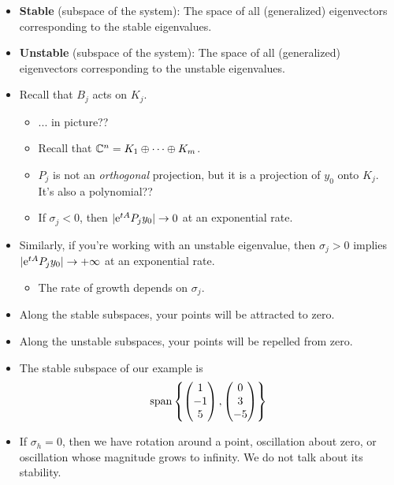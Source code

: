 \documentclass[../notes.tex]{subfiles}
\begin{document}
\begin{itemize}
    \item \textbf{Stable} (subspace of the system): The space of all (generalized) eigenvectors corresponding to the stable eigenvalues.
    \item \textbf{Unstable} (subspace of the system): The space of all (generalized) eigenvectors corresponding to the unstable eigenvalues.
    \item Recall that $B_j$ acts on $K_j$.
    \begin{itemize}
        \item ... in picture??
        \item Recall that $\C^n=K_1\oplus\cdots\oplus K_m$.
        \item $P_j$ is not an \emph{orthogonal} projection, but it is a projection of $y_0$ onto $K_j$. It's also a polynomial??
        \item If $\sigma_j<0$, then $|\e[tA]P_jy_0|\to 0$ at an exponential rate.
    \end{itemize}
    \item Similarly, if you're working with an unstable eigenvalue, then $\sigma_j>0$ implies $|\e[tA]P_jy_0|\to+\infty$ at an exponential rate.
    \begin{itemize}
        \item The rate of growth depends on $\sigma_j$.
    \end{itemize}
    \item Along the stable subspaces, your points will be attracted to zero.
    \item Along the unstable subspaces, your points will be repelled from zero.
    \item The stable subspace of our example is
    \begin{equation*}
        \spn\left\{
            \begin{pmatrix}
                1\\
                -1\\
                5\\
            \end{pmatrix},
            \begin{pmatrix}
                0\\
                3\\
                -5\\
            \end{pmatrix}
        \right\}
    \end{equation*}
    \item If $\sigma_h=0$, then we have rotation around a point, oscillation about zero, or oscillation whose magnitude grows to infinity. We do not talk about its stability.

\end{itemize}
\end{document}
